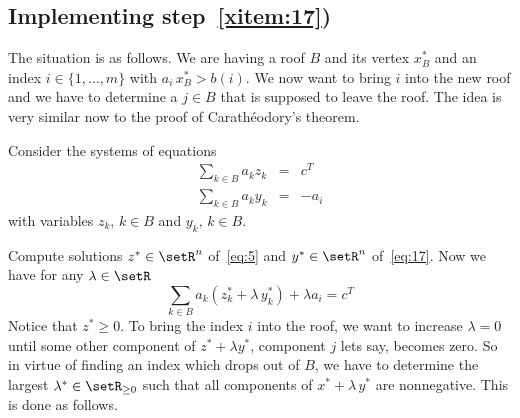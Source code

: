 \subsection{Implementing step~\ref{xitem:17})}









The situation is as follows. We are having a roof $B$ and its vertex
$x^*_B$ and an index $i \in \{1,\ldots,m\}$ with $a_i\,x^*_B> b(i)$. We now
want to bring $i$ into the new roof and we have to determine a $j \in
B$ that is supposed to leave the roof. The idea is very similar now to
the proof of Carath\'eodory's theorem. 

Consider the systems of equations 
\begin{eqnarray}
  \sum_{k \in B} a_k z_k   & = &  c^T \label{eq:5}\\
  \sum_{k \in B}  a_k y_k   & = &  -a_i \label{eq:17}
\end{eqnarray}
with variables $z_k, \, k \in B$ and $y_k,\, k \in B$. 

Compute    solutions $z^* \in \setR^{n}$ of~\eqref{eq:5} and  $y^* \in \setR^{n}$
of~\eqref{eq:17}. 
Now we have for any $\lambda \in \setR$ 
\begin{equation}
  \label{eq:49}
   \sum_{k \in B} a_k (z^*_k + \lambda\, y^*_k) + \lambda a_i= c^T
\end{equation}
Notice that $z^*\geq0$. 
To bring the index $i$ into the roof, we want to increase $\lambda = 0$
until some other component of $ z^* + \lambda y^*$, component $j$ lets say, becomes
zero. So in virtue of finding an index which drops out of $B$, we
have to determine the largest $\lambda^* \in \setR_{\geq0}$ such that all components of
$x^* + \lambda\,y^*$ are nonnegative. This is done as follows. 

